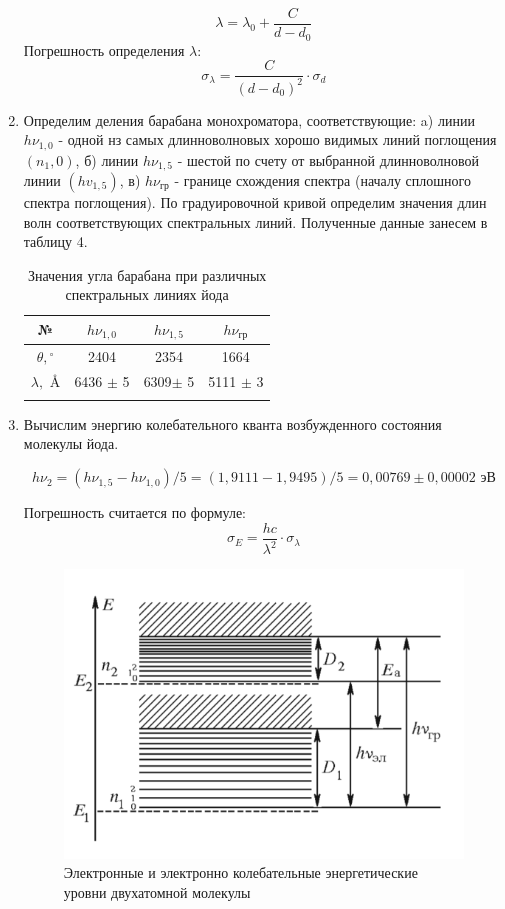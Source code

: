 \documentclass[a4paper, 12pt]{article}%
\begin{document}
\begin{enumerate}
	\begin{equation}\label{}
		\lambda = \lambda_0 + \frac{C}{d - d_0}
	\end{equation}
	Погрешность определения $\lambda$:
	\begin{equation}\label{}
		\sigma_{\lambda} = \frac{C}{(d - d_0)^2} \cdot \sigma_{d}
	\end{equation}
	
		
		\item Определим деления барабана монохроматора, соответствующие:
		a) линии $h \nu_{1,0}$ - одной нз самых длинноволновых хорошо видимых линий поглощения $\left(n_1, 0\right)$,
		б) линии $h \nu_{1,5}$ - шестой по счету от выбранной длинноволновой линии $\left(h v_{1,5}\right)$,
		в) $h \nu_{\text{гр}}$ - границе схождения спектра (началу сплошного спектра поглощения). По градуировочной кривой определим значения длин волн соответствующих спектральных линий. Полученные данные занесем в таблицу 4.
		
		\begin{longtable}{|c|c|c|c|}
			\hline
			№ & $h \nu_{1,0}$ & $h \nu_{1,5}$ & $h \nu_{\text{гр}}$  \\ \hline
			$\theta, {}^\circ$ & 2404 & 2354 & 1664 \\ \hline
			$\lambda, $ \AA & 6436 $\pm $ 5 & 6309$\pm $ 5 & 5111 $\pm $ 3 \\ \hline
			
			
			\caption{Значения угла барабана при различных спектральных линиях йода}
		\end{longtable}
		
		
		\item Вычислим энергию колебательного кванта возбужденного состояния молекулы йода.
		
		 $$ h \nu_2 = (h \nu_{1,5} - h \nu_{1,0})/5 = (1,9111 - 1,9495)/5 = 0,00769 \pm  0,00002 \text{ эВ}$$			
		 
		 Погрешность считается по формуле: 
	 	\begin{equation}\label{}
		 	\sigma_{E} = \frac{hc}{\lambda^2} \cdot \sigma_{\lambda}
		 \end{equation}

			
		\begin{figure}[H]
			\centering
			\includegraphics[width=0.6\linewidth]{lev}
			\caption{Электронные и электронно колебательные энергетические уровни двухатомной молекулы}
		\end{figure}
		

\end{enumerate}
\end{document}
